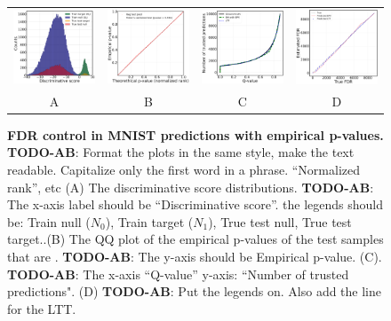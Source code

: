 \documentclass{article}
\newcommand{\todo}[2]{{\color{red} {\bf TODO-#1}: #2}}
\begin{document}
\begin{figure}
	\centering
	\begin{tabular}{cccc}
		\includegraphics[width=1.7in]{img/cls_overview.png}&
		\includegraphics[width=1.7in]{img/cnn_QQ_classical_lin.png} &
		\includegraphics[width=1.7in]{img/cnn_classical_fdr_control.png} &
		\includegraphics[width=1.7in]{img/cnn_FDRQQ_classical.png} \\
			
		A & B & C & D \\
	\end{tabular}
	\caption{{\bf FDR control in MNIST predictions with empirical p-values. }\todo{AB}{Format the plots in the same style, make the text readable.  Capitalize only the first word in a phrase. ``Normalized rank'', etc }
		(A) The discriminative score distributions. \todo{AB}{The x-axis label should be ``Discriminative score''. the legends should be: Train null ($N_0$), Train target ($N_1$), True test null, True test target.}.(B) The QQ plot of the empirical p-values of the test samples that are .  \todo{AB}{The y-axis should be Empirical p-value.} (C).  \todo{AB}{The x-axis ``Q-value'' y-axis: ``Number of trusted predictions".} (D) \todo{AB}{Put the legends on. Also add the line for the LTT.} }
	\label{fig:multi}
\end{figure}
\end{document}
